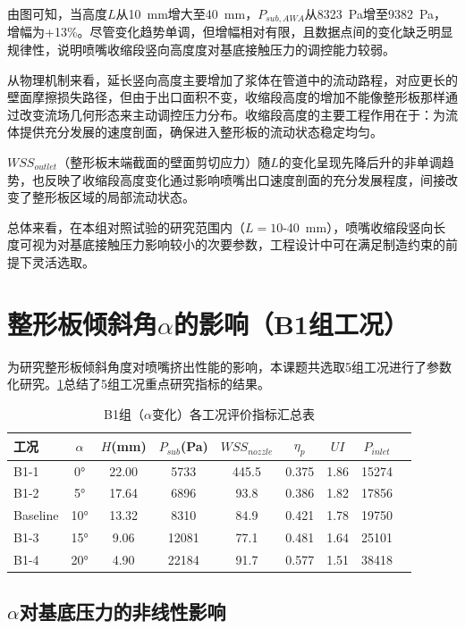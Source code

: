 由图可知，当高度$L$从10~mm增大至40~mm，$P_{sub,AWA}$从8323~Pa增至9382~Pa，增幅为+13\%。尽管变化趋势单调，但增幅相对有限，且数据点间的变化缺乏明显规律性，说明喷嘴收缩段竖向高度度对基底接触压力的调控能力较弱。

从物理机制来看，延长竖向高度主要增加了浆体在管道中的流动路程，对应更长的壁面摩擦损失路径，但由于出口面积不变，收缩段高度的增加不能像整形板那样通过改变流场几何形态来主动调控压力分布。收缩段高度的主要工程作用在于：为流体提供充分发展的速度剖面，确保进入整形板的流动状态稳定均匀。

$WSS_{outlet}$（整形板末端截面的壁面剪切应力）随$L$的变化呈现先降后升的非单调趋势，也反映了收缩段高度变化通过影响喷嘴出口速度剖面的充分发展程度，间接改变了整形板区域的局部流动状态。

总体来看，在本组对照试验的研究范围内（$L = 10$-40~mm），喷嘴收缩段竖向长度可视为对基底接触压力影响较小的次要参数，工程设计中可在满足制造约束的前提下灵活选取。

\section{整形板倾斜角$\alpha$的影响（B1组工况）}\label{sec:alpha-influence}

为研究整形板倾斜角度对喷嘴挤出性能的影响，本课题共选取5组工况进行了参数化研究。\cref{tab:4.4}总结了5组工况重点研究指标的结果。

\begin{table}[!htb]
  \centering
  \caption{B1组（$\alpha$变化）各工况评价指标汇总表}\label{tab:4.4}
  \renewcommand{\arraystretch}{1.3}
  \begin{tabular}{lcccccccc}
    \toprule
    \textbf{工况} & $\alpha$ & $H$(mm) & $P_{sub}$(Pa) & $WSS_{nozzle}$ & $\eta_p$ & $UI$ & $P_{inlet}$ \\
    \midrule
    B1-1     & 0°  & 22.00 & 5733  & 445.5 & 0.375 & 1.86 & 15274 \\
    B1-2     & 5°  & 17.64 & 6896  & 93.8  & 0.386 & 1.82 & 17856 \\
    Baseline & 10° & 13.32 & 8310  & 84.9  & 0.421 & 1.78 & 19750 \\
    B1-3     & 15° & 9.06  & 12081 & 77.1  & 0.481 & 1.64 & 25101 \\
    B1-4     & 20° & 4.90  & 22184 & 91.7  & 0.577 & 1.51 & 38418 \\
    \bottomrule
  \end{tabular}
\end{table}

\subsection{$\alpha$对基底压力的非线性影响}

